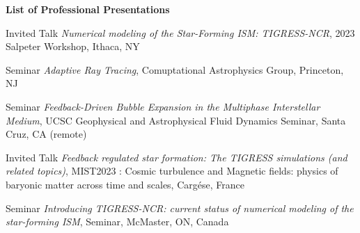 \documentclass[12pt]{article}
\begin{document}




\begin{itemize}[itemsep=0pt,topsep=\parskip]
\small 
\end{itemize}





\begin{itemize}[itemsep=0pt,topsep=\parskip]
\small 
\end{itemize}


\begin{center}
{\large \bf List of Professional Presentations}
\end{center}


{Invited Talk}
{\emph{Numerical modeling of the Star-Forming ISM: TIGRESS-NCR},
2023 Salpeter Workshop,
Ithaca, NY}

{Seminar}
{\emph{Adaptive Ray Tracing},
Comuptational Astrophysics Group,
Princeton, NJ}

{Seminar}
{\emph{Feedback-Driven Bubble Expansion in the Multiphase Interstellar Medium},
UCSC Geophysical and Astrophysical Fluid Dynamics Seminar,
Santa Cruz, CA (remote)}

{Invited Talk}
{\emph{Feedback regulated star formation: The TIGRESS simulations (and related topics)},
MIST2023 : Cosmic turbulence and Magnetic fields: physics of baryonic matter across time and scales,
Carg\'ese, France}

{Seminar}
{\emph{Introducing TIGRESS-NCR: current status of numerical modeling of the star-forming ISM},
Seminar,
McMaster, ON, Canada}
\end{document}
